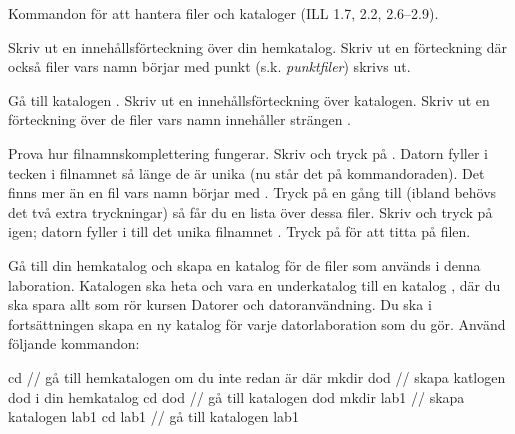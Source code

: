 \begin{Datorarbete}
	\item Kommandon för att hantera filer och kataloger (ILL 1.7, 2.2, 2.6--2.9).

	\begin{Deluppgifter}
		\item Skriv ut en innehållsförteckning över din hemkatalog. Skriv ut en förteckning där också filer vars namn börjar med punkt (s.k. \emph{punktfiler}) skrivs ut.
		\item Gå till katalogen . Skriv ut en innehållsförteckning över katalogen. Skriv ut en förteckning över de filer vars namn innehåller strängen .
		\item Prova hur filnamnskomplettering fungerar. Skriv  och tryck på . Datorn fyller i tecken i filnamnet så länge de är unika (nu står det  på kommando\-raden). Det finns mer än en fil vars namn börjar med . Tryck på  en gång till (ibland behövs det två extra tryckningar) så får du en lista över dessa filer. Skriv  och tryck på  igen; datorn fyller i till det unika filnamnet . Tryck på  för att titta på filen.
		\item Gå till din hemkatalog och skapa en katalog för de filer som används i denna laboration. Katalogen ska heta  och vara en underkatalog till en katalog , där du ska spara allt som rör kursen Datorer och datoranvändning. Du ska i fortsättningen skapa en ny katalog för varje datorlaboration som du gör. Använd följande kommandon:

		\begin{Code}
			cd          // gå till hemkatalogen om du inte redan är där
			mkdir dod   // skapa katlogen dod i din hemkatalog
			cd dod      // gå till katalogen dod
			mkdir lab1  // skapa katalogen lab1
			cd lab1     // gå till katalogen lab1
		\end{Code}



\end{Deluppgifter}
\end{Datorarbete}

